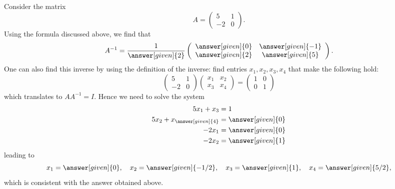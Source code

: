 \documentclass{ximera}
\begin{document}
Consider the matrix
\[
A= \left(\begin{array}{cc}
  5 &  1 \\
  -2 &  0
\end{array}\right).
\]
Using the formula discussed above, we find that
\begin{equation}\label{Amatrix}
A^{-1}= \frac{1}{\answer[given]{2}} \left(\begin{array}{cc}
  \answer[given]{0} &  \answer[given]{-1} \\
  \answer[given]{2} &  \answer[given]{5}
\end{array}\right).
\end{equation}
One can also find this inverse by using the definition of the inverse: find entries $x_{1}, x_{2}, x_{3}, x_{4}$ that make the following hold:
\[
\left(\begin{array}{cc}
  5 &  1 \\
  -2 &  0
\end{array}\right) \left(\begin{array}{cc}
  x_{1} &  x_{2} \\
  x_{3} &  x_{4}
\end{array}\right)= \left(\begin{array}{cc}
  1 &  0 \\
  0 &  1
\end{array}\right)
\]
which translates to $AA^{-1}=I$. Hence we need to solve the system
\begin{align*}
5x_{1}+x_{3}&=1\\
5x_{2} + x_{\answer[given]{4}} &= \answer[given]{0}\\
-2x_{1}&= \answer[given]{0}\\
-2x_{2} &= \answer[given]{1}
\end{align*}
leading to
\begin{equation*}
  x_{1} = \answer[given]{0}, \quad
  x_{2} =\answer[given]{-1/2}, \quad
  x_{3} = \answer[given]{1}, \quad
  x_{4} = \answer[given]{5/2},
\end{equation*}
which is consistent with the answer obtained above.
\end{document}

